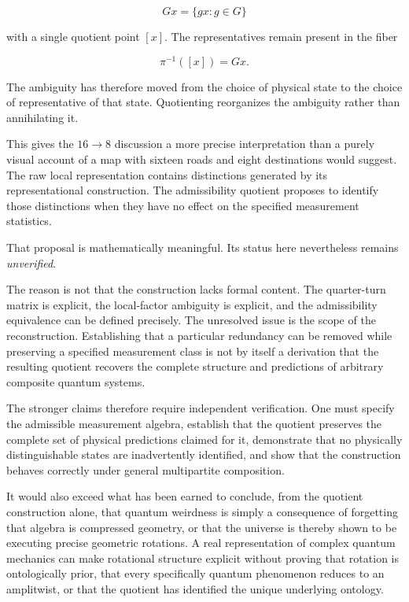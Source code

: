 \documentclass[11pt]{article}
\begin{document}
\begin{equation}
Gx=\{gx:g\in G\}
\end{equation}

with a single quotient point $[x]$. The representatives remain present in the fiber

\begin{equation}
\pi^{-1}([x])=Gx.
\end{equation}

The ambiguity has therefore moved from the choice of physical state to the choice of representative of that state. Quotienting reorganizes the ambiguity rather than annihilating it.

This gives the $16\to8$ discussion a more precise interpretation than a purely visual account of a map with sixteen roads and eight destinations would suggest. The raw local representation contains distinctions generated by its representational construction. The admissibility quotient proposes to identify those distinctions when they have no effect on the specified measurement statistics.

That proposal is mathematically meaningful. Its status here nevertheless remains \emph{unverified}.

The reason is not that the construction lacks formal content. The quarter-turn matrix is explicit, the local-factor ambiguity is explicit, and the admissibility equivalence can be defined precisely. The unresolved issue is the scope of the reconstruction. Establishing that a particular redundancy can be removed while preserving a specified measurement class is not by itself a derivation that the resulting quotient recovers the complete structure and predictions of arbitrary composite quantum systems.

The stronger claims therefore require independent verification. One must specify the admissible measurement algebra, establish that the quotient preserves the complete set of physical predictions claimed for it, demonstrate that no physically distinguishable states are inadvertently identified, and show that the construction behaves correctly under general multipartite composition.

It would also exceed what has been earned to conclude, from the quotient construction alone, that quantum weirdness is simply a consequence of forgetting that algebra is compressed geometry, or that the universe is thereby shown to be executing precise geometric rotations. A real representation of complex quantum mechanics can make rotational structure explicit without proving that rotation is ontologically prior, that every specifically quantum phenomenon reduces to an amplitwist, or that the quotient has identified the unique underlying ontology.
\end{document}
